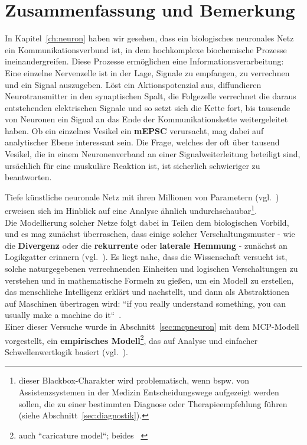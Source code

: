 \chapter{Zusammenfassung und Bemerkung}



In Kapitel~\ref{ch:neuron} haben wir gesehen, dass ein biologisches neuronales Netz ein Kommunikationsverbund ist, in dem hochkomplexe biochemische Prozesse ineinandergreifen.
Diese Prozesse ermöglichen eine Informationsverarbeitung: Eine einzelne Nervenzelle ist in der Lage, Signale zu empfangen, zu verrechnen und ein Signal auszugeben.
Löst ein Aktionspotenzial aus, diffundieren Neurotransmitter in den synaptischen Spalt, die Folgezelle verrechnet die daraus entstehenden elektrischen Signale und so setzt sich die Kette fort, bis tausende von Neuronen ein Signal an das Ende der Kommunikationskette weitergeleitet haben.
Ob ein einzelnes Vesikel ein \textbf{mEPSC} verursacht, mag dabei auf analytischer Ebene interessant sein.
Die Frage, welches der oft über tausend Vesikel, die in einem Neuronenverband an einer Signalweiterleitung beteiligt sind, ursächlich für eine muskuläre Reaktion ist, ist sicherlich schwieriger zu beantworten.

Tiefe künstliche neuronale Netz mit ihren Millionen von Parametern (vgl.~\cite{SVI+15}) erweisen sich im Hinblick auf eine Analyse ähnlich undurchschaubar\footnote{ dieser Blackbox-Charakter wird problematisch, wenn {bspw.} von Assistenzsystemen in der Medizin Entscheidungswege aufgezeigt werden sollen, die zu einer bestimmten Diagnose oder Therapieempfehlung führen (siehe Abschnitt~\ref{sec:diagnostik}).}.\\

Die Modellierung solcher Netze folgt dabei in Teilen dem biologischen Vorbild, und es mag zunächst überraschen, dass einige solcher Verschaltungsmuster - wie die \textbf{Divergenz} oder die \textbf{rekurrente} oder \textbf{laterale Hemmung} - zunächst an Logikgatter erinnern (vgl.~\cite[58 f.]{Eil19}). Es liegt nahe, dass die Wissenschaft versucht ist, solche naturgegebenen verrechnenden Einheiten und logischen Verschaltungen zu verstehen und in mathematische Formeln zu gießen, um ein Modell zu erstellen, das menschliche Intelligenz erklärt und nachstellt, und dann als Abstraktionen auf Maschinen übertragen wird: ``if you really understand something, you can usually make a machine do it``~\cite[xiii]{AR88}.\\

Einer dieser Versuche wurde in Abschnitt~\ref{sec:mcpneuron} mit dem MCP-Modell vorgestellt, ein \textbf{empirisches Modell}\footnote{
    auch ``caricature model``; beides ~\cite[4]{HI97}
}, das auf Analyse und einfacher Schwellenwertlogik basiert (vgl.~\cite[16]{AR88}).

